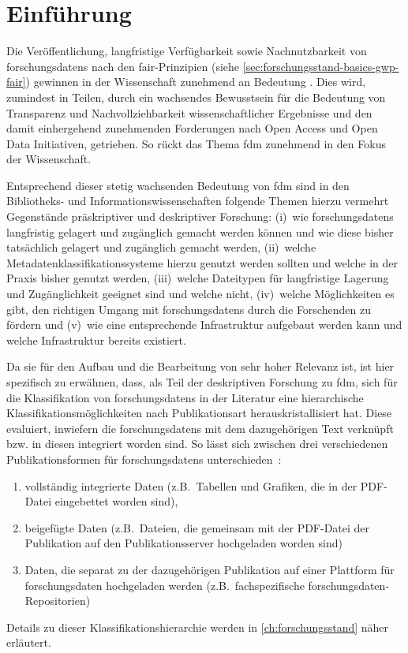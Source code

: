 \chapter{Einführung}\label{ch:einfuehrung}

Die Veröffentlichung, langfristige Verfügbarkeit sowie Nachnutzbarkeit von \glspl{forschungsdaten} nach den \gls{fair}-Prinzipien (siehe \cref{sec:forschungsstand-basics-gwp-fair}) gewinnen in der Wissenschaft zunehmend an Bedeutung .
Dies wird, zumindest in Teilen, durch ein wachsendes Bewusstsein für die Bedeutung von Transparenz und Nachvollziehbarkeit wissenschaftlicher Ergebnisse und den damit einhergehend zunehmenden Forderungen nach Open Access und Open Data Initiativen, getrieben.
So rückt das Thema \gls{fdm} zunehmend in den Fokus der Wissenschaft.

Entsprechend dieser stetig wachsenden Bedeutung von \gls{fdm} sind in den Bibliotheks- und Informationswissenschaften folgende Themen hierzu vermehrt Gegenstände präskriptiver und deskriptiver Forschung:
(i)~wie \glspl{forschungsdaten} langfristig gelagert und zugänglich gemacht werden können und wie diese bisher tatsächlich gelagert und zugänglich gemacht werden,
(ii)~welche Metadatenklassifikationssysteme hierzu genutzt werden sollten und welche in der Praxis bisher genutzt werden,
(iii)~welche Dateitypen für langfristige Lagerung und Zugänglichkeit geeignet sind und welche nicht,
(iv)~welche Möglichkeiten es gibt, den richtigen Umgang mit \glspl{forschungsdaten} durch die Forschenden zu fördern und
(v)~wie eine entsprechende Infrastruktur aufgebaut werden kann und welche Infrastruktur bereits existiert.

Da sie für den Aufbau und die Bearbeitung von sehr hoher Relevanz ist, ist hier spezifisch zu erwähnen, dass, als Teil der deskriptiven Forschung zu \gls{fdm}, sich für die Klassifikation von \glspl{forschungsdaten} in der Literatur eine hierarchische Klassifikationsmöglichkeiten nach Publikationsart herauskristallisiert hat.
Diese evaluiert, inwiefern die \glspl{forschungsdaten} mit dem dazugehörigen Text verknüpft bzw. in diesen integriert worden sind.
So lässt sich zwischen drei verschiedenen Publikationsformen für \glspl{forschungsdaten} unterschieden~\autocites[S.~36ff.]{ReillyEtAl2011}:
\begin{enumerate}
    \item vollständig integrierte Daten (z.B.~Tabellen und Grafiken, die in der PDF-Datei eingebettet worden sind),
    \item beigefügte Daten (z.B.~Dateien, die gemeinsam mit der PDF-Datei der Publikation auf den Publikationsserver hochgeladen worden sind)
    \item Daten, die separat zu der dazugehörigen Publikation auf einer Plattform für \gls{forschungsdaten} hochgeladen werden (z.B.~fachspezifische \gls{forschungsdaten}-Repositorien)
\end{enumerate}
Details zu dieser Klassifikationshierarchie werden in \cref{ch:forschungsstand} näher erläutert.


